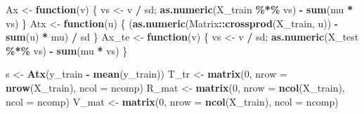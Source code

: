 \documentclass[
]{article}
\newenvironment{Shaded}{\begin{snugshade}}{\end{snugshade}}
\newcommand{\AttributeTok}[1]{\textcolor[rgb]{0.13,0.29,0.53}{#1}}
\newcommand{\ControlFlowTok}[1]{\textcolor[rgb]{0.13,0.29,0.53}{\textbf{#1}}}
\newcommand{\DecValTok}[1]{\textcolor[rgb]{0.00,0.00,0.81}{#1}}
\newcommand{\FunctionTok}[1]{\textcolor[rgb]{0.13,0.29,0.53}{\textbf{#1}}}
\newcommand{\NormalTok}[1]{#1}
\newcommand{\OtherTok}[1]{\textcolor[rgb]{0.56,0.35,0.01}{#1}}
\newcommand{\SpecialCharTok}[1]{\textcolor[rgb]{0.81,0.36,0.00}{\textbf{#1}}}
\begin{document}
\begin{Shaded}
\begin{Highlighting}[]
\NormalTok{  Ax    }\OtherTok{\textless{}{-}} \ControlFlowTok{function}\NormalTok{(v) \{ vs }\OtherTok{\textless{}{-}}\NormalTok{ v }\SpecialCharTok{/}\NormalTok{ sd; }\FunctionTok{as.numeric}\NormalTok{(X\_train }\SpecialCharTok{\%*\%}\NormalTok{ vs) }\SpecialCharTok{{-}} \FunctionTok{sum}\NormalTok{(mu }\SpecialCharTok{*}\NormalTok{ vs) \}}
\NormalTok{  Atx   }\OtherTok{\textless{}{-}} \ControlFlowTok{function}\NormalTok{(u) \{ (}\FunctionTok{as.numeric}\NormalTok{(Matrix}\SpecialCharTok{::}\FunctionTok{crossprod}\NormalTok{(X\_train, u)) }\SpecialCharTok{{-}} \FunctionTok{sum}\NormalTok{(u) }\SpecialCharTok{*}\NormalTok{ mu) }\SpecialCharTok{/}\NormalTok{ sd \}}
\NormalTok{  Ax\_te }\OtherTok{\textless{}{-}} \ControlFlowTok{function}\NormalTok{(v) \{ vs }\OtherTok{\textless{}{-}}\NormalTok{ v }\SpecialCharTok{/}\NormalTok{ sd; }\FunctionTok{as.numeric}\NormalTok{(X\_test  }\SpecialCharTok{\%*\%}\NormalTok{ vs) }\SpecialCharTok{{-}} \FunctionTok{sum}\NormalTok{(mu }\SpecialCharTok{*}\NormalTok{ vs) \}}
  
\NormalTok{  s }\OtherTok{\textless{}{-}} \FunctionTok{Atx}\NormalTok{(y\_train }\SpecialCharTok{{-}} \FunctionTok{mean}\NormalTok{(y\_train))}
\NormalTok{  T\_tr }\OtherTok{\textless{}{-}} \FunctionTok{matrix}\NormalTok{(}\DecValTok{0}\NormalTok{, }\AttributeTok{nrow =} \FunctionTok{nrow}\NormalTok{(X\_train), }\AttributeTok{ncol =}\NormalTok{ ncomp)}
\NormalTok{  R\_mat }\OtherTok{\textless{}{-}} \FunctionTok{matrix}\NormalTok{(}\DecValTok{0}\NormalTok{, }\AttributeTok{nrow =} \FunctionTok{ncol}\NormalTok{(X\_train), }\AttributeTok{ncol =}\NormalTok{ ncomp)}
\NormalTok{  V\_mat }\OtherTok{\textless{}{-}} \FunctionTok{matrix}\NormalTok{(}\DecValTok{0}\NormalTok{, }\AttributeTok{nrow =} \FunctionTok{ncol}\NormalTok{(X\_train), }\AttributeTok{ncol =}\NormalTok{ ncomp)}
  

\end{Highlighting}
\end{Shaded}
\end{document}
